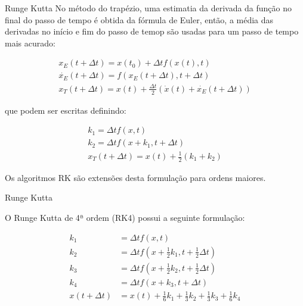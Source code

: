 \documentclass{beamer}
\newcommand{\jindent}{\justifying\setlength{\parindent}{1.5em}}
\begin{document}

\begin{frame}{Runge Kutta}
    \jindent
    No método do trapézio, uma estimatia da derivada da função no final do passo de tempo é obtida da fórmula de Euler, então, a média das derivadas no início e fim do passo de temop são usadas para um passo de tempo mais acurado:

    \begin{gather*}
        x_E(t+\Delta t) = x(t_0) + \Delta t f(x(t), t)\\
        \dot{x_E}(t+\Delta t) = f(x_E(t+\Delta t), t + \Delta t)\\
        x_T(t + \Delta t) = x(t) + \frac{\Delta t}{2} ( \dot{x}(t) + \dot{x_E}(t+\Delta t) )
    \end{gather*}

    \justifying que podem ser escritas definindo:

    \begin{gather*}
        k_1 = \Delta t f(x,t)\\
        k_2 = \Delta t f(x + k_1, t + \Delta t)\\
        x_T(t+\Delta t) = x(t) + \frac{1}{2}(k_1 + k_2)
    \end{gather*}

    Os algoritmos RK são extensões desta formulação para ordens maiores.
    
\end{frame}



\begin{frame}{Runge Kutta}

    O Runge Kutta de 4ª ordem (RK4) possui a seguinte formulação:

    \begin{align*}
        k_1 &= \Delta t f(x,t) \\
        k_2 &= \Delta t f(x+\frac{1}{2}k_1,t+\frac{1}{2}\Delta t) \\
        k_3 &= \Delta t f(x+\frac{1}{2}k_2,t+\frac{1}{2}\Delta t) \\
        k_4 &= \Delta t f(x+k_3,t+\Delta t)  \\
        x(t+\Delta t) &= x(t) + \frac{1}{6}k_1 + \frac{1}{3}k_2 + \frac{1}{3}k_3 +\frac{1}{6}k_4
    \end{align*}
    
\end{frame}
\end{document}
